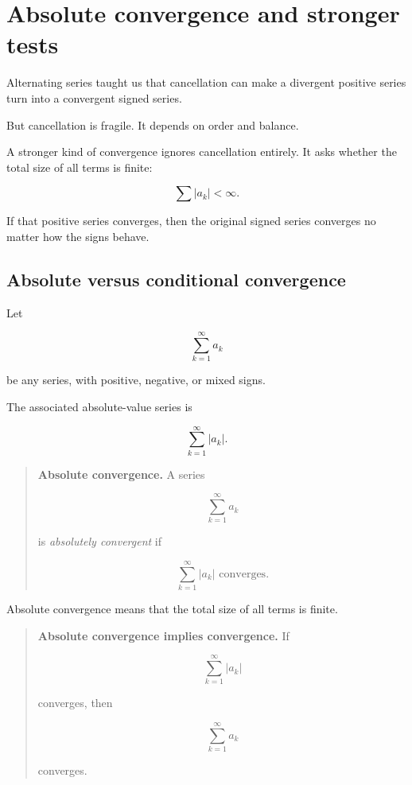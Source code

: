 \section{Absolute convergence and stronger tests}
\label{sec:absolute-convergence-stronger-tests}

Alternating series taught us that cancellation can make a divergent positive series turn
into a convergent signed series.

But cancellation is fragile.  It depends on order and balance.

A stronger kind of convergence ignores cancellation entirely.  It asks whether the total
size of all terms is finite:

\[
\sum |a_k|<\infty.
\]

If that positive series converges, then the original signed series converges no matter how
the signs behave.

\subsection{Absolute versus conditional convergence}
\label{subsec:absolute-versus-conditional-convergence}

Let

\[
\sum_{k=1}^{\infty}a_k
\]

be any series, with positive, negative, or mixed signs.

The associated absolute-value series is

\[
\sum_{k=1}^{\infty}|a_k|.
\]

\begin{quote}
\textbf{Absolute convergence.}
A series

\[
\sum_{k=1}^{\infty}a_k
\]

is \emph{absolutely convergent} if

\[
\boxed{
\sum_{k=1}^{\infty}|a_k| \text{ converges.}
}
\]
\end{quote}

Absolute convergence means that the total size of all terms is finite.

\begin{quote}
\textbf{Absolute convergence implies convergence.}
If

\[
\sum_{k=1}^{\infty}|a_k|
\]

converges, then

\[
\sum_{k=1}^{\infty}a_k
\]

converges.
\end{quote}

